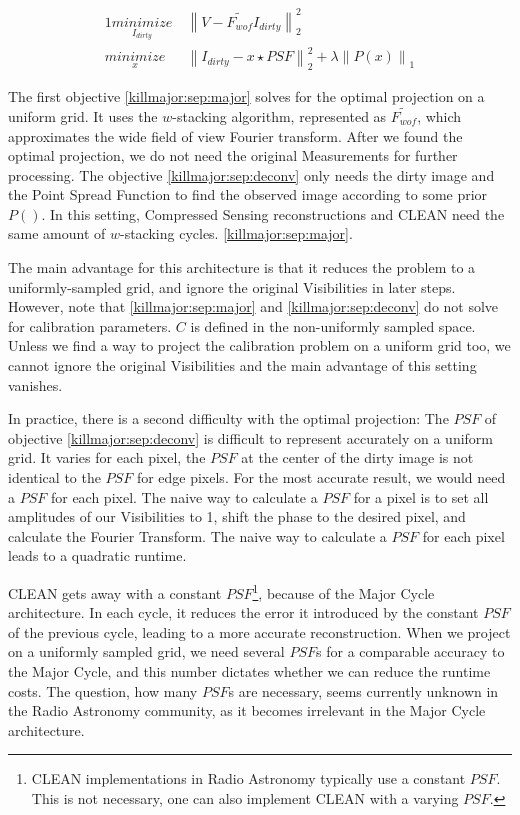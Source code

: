 \begin{alignat}{1}
\underset{I_{dirty}}{minimize} \:& \left \|  V - \tilde{F_{wof}}I_{dirty} \right \|_2^2\label{killmajor:sep:major}\\
\underset{x}{minimize} \:& \left \| I_{dirty} - x \star PSF \right \|_2^2 + \lambda \left \| P(x) \right \|_1 \label{killmajor:sep:deconv}
\end{alignat}


The first objective \eqref{killmajor:sep:major} solves for the optimal projection on a uniform grid. It uses the $w$-stacking algorithm, represented as $\tilde{F_{wof}}$, which approximates the wide field of view Fourier transform. After we found the optimal projection, we do not need the original Measurements for further processing. The objective \eqref{killmajor:sep:deconv} only needs the dirty image and the Point Spread Function to find the observed image according to some prior $P()$. In this setting, Compressed Sensing reconstructions and CLEAN need the same amount of $w$-stacking cycles.  \eqref{killmajor:sep:major}. 

The main advantage for this architecture is that it reduces the problem to a uniformly-sampled grid, and ignore the original Visibilities in later steps. However, note that \eqref{killmajor:sep:major} and \eqref{killmajor:sep:deconv} do not solve for calibration parameters. $C$ is defined in the non-uniformly sampled space. Unless we find a way to project the calibration problem on a uniform grid too, we cannot ignore the original Visibilities and the main advantage of this setting vanishes. 

In practice, there is a second difficulty with the optimal projection: The $PSF$ of objective \eqref{killmajor:sep:deconv} is difficult to represent accurately on a uniform grid. It varies for each pixel, the $PSF$ at the center of the dirty image is not identical to the $PSF$ for edge pixels. For the most accurate result, we would need a $PSF$ for each pixel. The naive way to calculate a $PSF$ for a pixel is to set all amplitudes of our Visibilities to 1, shift the phase to the desired pixel, and calculate the Fourier Transform. The naive way to calculate a $PSF$ for each pixel leads to a quadratic runtime.

CLEAN gets away with a constant $PSF$\footnote{CLEAN implementations in Radio Astronomy typically use a constant $PSF$. This is not necessary, one can also implement CLEAN with a varying $PSF$.}, because of the Major Cycle architecture. In each cycle, it reduces the error it introduced by the constant $PSF$ of the previous cycle, leading to a more accurate reconstruction. When we project on a uniformly sampled grid, we need several $PSF$s for a comparable accuracy to the Major Cycle, and this number dictates whether we can reduce the runtime costs. The question, how many $PSF$s are necessary, seems currently unknown in the Radio Astronomy community, as it becomes irrelevant in the Major Cycle architecture.






